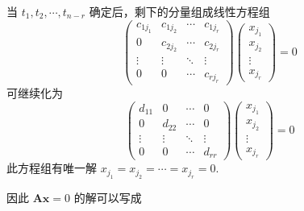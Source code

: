 \documentclass[11pt,letter,notitlepage]{article}
\begin{document}
\begin{solution}
\begin{enumerate}
\begin{enumerate}
                        当 $t_1, t_2, \cdots, t_{n-r}$ 确定后，剩下的分量组成线性方程组
                        $$\begin{pmatrix}
                                c_{1 j_1} & c_{1 j_2} & \cdots & c_{1 j_r} \\
                                0         & c_{2 j_2} & \cdots & c_{2 j_r} \\
                                \vdots    & \vdots    & \ddots & \vdots    \\
                                0         & 0         & \cdots & c_{r j_r}
                            \end{pmatrix}
                            \begin{pmatrix}
                                x_{j_1} \\ x_{j_2}\\ \vdots\\ x_{j_r}
                            \end{pmatrix}=0$$
                        可继续化为
                        $$\begin{pmatrix}
                                d_{11} & 0      & \cdots & 0      \\
                                0      & d_{22} & \cdots & 0      \\
                                \vdots & \vdots & \ddots & \vdots \\
                                0      & 0      & \cdots & d_{rr}
                            \end{pmatrix}
                            \begin{pmatrix}
                                x_{j_1} \\ x_{j_2}\\ \vdots\\ x_{j_r}
                            \end{pmatrix}=0$$
                        此方程组有唯一解 $x_{j_1}=x_{j_2}=\cdots=x_{j_r}=0$.

                        因此 $\mathbf{Ax}=0$ 的解可以写成


\end{enumerate}
\end{enumerate}
\end{solution}
\end{document}
